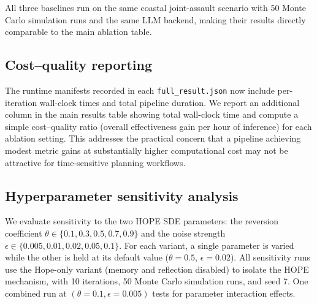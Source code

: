 All three baselines run on the same coastal joint-assault scenario with 50 Monte Carlo simulation runs and the same LLM backend, making their results directly comparable to the main ablation table.

\subsection{Cost--quality reporting}

The runtime manifests recorded in each \texttt{full\_result.json} now include per-iteration wall-clock times and total pipeline duration. We report an additional column in the main results table showing total wall-clock time and compute a simple cost--quality ratio (overall effectiveness gain per hour of inference) for each ablation setting. This addresses the practical concern that a pipeline achieving modest metric gains at substantially higher computational cost may not be attractive for time-sensitive planning workflows.

\subsection{Hyperparameter sensitivity analysis}
\label{sec:hyperparam-sensitivity}

We evaluate sensitivity to the two HOPE SDE parameters: the reversion coefficient $\theta \in \{0.1, 0.3, 0.5, 0.7, 0.9\}$ and the noise strength $\epsilon \in \{0.005, 0.01, 0.02, 0.05, 0.1\}$. For each variant, a single parameter is varied while the other is held at its default value ($\theta=0.5$, $\epsilon=0.02$). All sensitivity runs use the Hope-only variant (memory and reflection disabled) to isolate the HOPE mechanism, with 10 iterations, 50 Monte Carlo simulation runs, and seed 7. One combined run at $(\theta=0.1, \epsilon=0.005)$ tests for parameter interaction effects.
